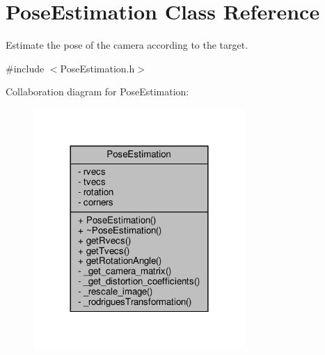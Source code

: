 \hypertarget{class_pose_estimation}{}\section{Pose\+Estimation Class Reference}
\label{class_pose_estimation}


Estimate the pose of the camera according to the target.  




{\ttfamily \#include $<$Pose\+Estimation.\+h$>$}



Collaboration diagram for Pose\+Estimation\+:\nopagebreak
\begin{figure}[H]
\begin{center}
\leavevmode
\includegraphics[width=228pt]{class_pose_estimation__coll__graph}
\end{center}
\end{figure}
